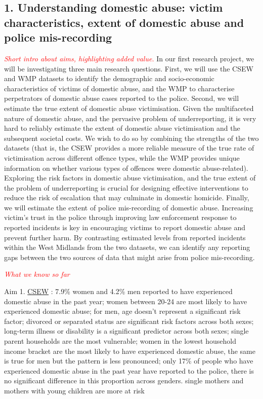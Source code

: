 \documentclass[11pt, a4paper]{article}
\begin{document}
\subsection*{1. Understanding domestic abuse: victim characteristics, extent of domestic abuse and police mis-recording}

 \textcolor{red}{\textit{Short intro about aims, highlighting added value.}}
In our first research project, we will be investigating three main research questions. First, we will use the CSEW and WMP datasets to identify the demographic and socio-economic characteristics of victims of domestic abuse, and the WMP to characterise perpetrators of domestic abuse cases reported to the police. Second, we will estimate the true extent of domestic abuse victimisation. Given the multifaceted nature of domestic abuse, and the pervasive problem of underreporting, it is very hard to reliably estimate the extent of domestic abuse victimisation and the subsequent societal costs. We wish to do so by combining the strengths of the two datasets (that is, the CSEW provides a more reliable measure of the true rate of victimisation across different offence types, while the WMP provides unique information on whether various types of offences were domestic abuse-related). Exploring the risk factors in domestic abuse victimisation, and the true extent of the problem of underreporting is crucial for designing effective interventions to reduce the risk of escalation that may culminate in domestic homicide. Finally, we will estimate the extent of police mis-recording of domestic abuse. Increasing victim's trust in the police through improving law enforcement response to reported incidents is key in encouraging victims to report domestic abuse and prevent further harm. By contrasting estimated levels from reported incidents within the West Midlands from the two datasets, we can identify any reporting gaps between the two sources of data that might arise from police mis-recording.

\textcolor{red}{\textit{What we know so far}} 

Aim 1. \href{https://www.ons.gov.uk/peoplepopulationandcommunity/crimeandjustice/articles/domesticabusefindingsfromthecrimesurveyforenglandandwales/yearendingmarch2018}{CSEW} : 7.9\% women and 4.2\% men reported to have experienced domestic abuse in the past year; women between 20-24 are most likely to have experienced domestic abuse; for men, age doesn't represent a significant risk factor;  divorced or separated status are significant risk factors across both sexes; long-term illness or disability is a significant predictor across both sexes; single parent households are the most vulnerable; women in the lowest household income bracket are the most likely to have experienced domestic abuse, the same is true for men but the pattern is less pronounced; only 17\% of people who have experienced domestic abuse in the past year have reported to the police, there is no significant difference in this proportion across genders.   
single mothers and mothers with young children are more at risk
\end{document}
